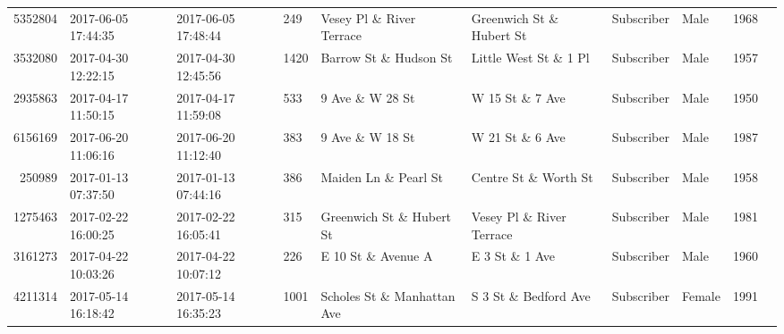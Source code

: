 \documentclass[11pt]{article}
\begin{document}
\begin{description}
\begin{tabular}{r|lllllllll}
	 5352804                       & 2017-06-05 17:44:35           & 2017-06-05 17:48:44           &  249                          & Vesey Pl \& River Terrace    & Greenwich St \& Hubert St    & Subscriber                    & Male                          & 1968                         \\
	 3532080                       & 2017-04-30 12:22:15           & 2017-04-30 12:45:56           & 1420                          & Barrow St \& Hudson St       & Little West St \& 1 Pl       & Subscriber                    & Male                          & 1957                         \\
	 2935863                       & 2017-04-17 11:50:15           & 2017-04-17 11:59:08           &  533                          & 9 Ave \& W 28 St             & W 15 St \& 7 Ave             & Subscriber                    & Male                          & 1950                         \\
	 6156169                       & 2017-06-20 11:06:16           & 2017-06-20 11:12:40           &  383                          & 9 Ave \& W 18 St             & W 21 St \& 6 Ave             & Subscriber                    & Male                          & 1987                         \\
	  250989                       & 2017-01-13 07:37:50           & 2017-01-13 07:44:16           &  386                          & Maiden Ln \& Pearl St        & Centre St \& Worth St        & Subscriber                    & Male                          & 1958                         \\
	 1275463                       & 2017-02-22 16:00:25           & 2017-02-22 16:05:41           &  315                          & Greenwich St \& Hubert St    & Vesey Pl \& River Terrace    & Subscriber                    & Male                          & 1981                         \\
	 3161273                       & 2017-04-22 10:03:26           & 2017-04-22 10:07:12           &  226                          & E 10 St \& Avenue A          & E 3 St \& 1 Ave              & Subscriber                    & Male                          & 1960                         \\
	 4211314                       & 2017-05-14 16:18:42           & 2017-05-14 16:35:23           & 1001                          & Scholes St \& Manhattan Ave  & S 3 St \& Bedford Ave        & Subscriber                    & Female                        & 1991                         \\

\end{tabular}
\end{description}
\end{document}
